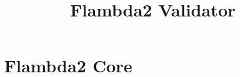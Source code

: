 \documentclass[11pt,fleqn]{amsart}
\begin{document}
\title{Flambda2 Validator}
\date{}
\maketitle{}


\section{Flambda2 Core}

\newcommand{\expr}{\mathit{exp}}
\newcommand{\var}{\mathit{var}}
\newcommand{\named}{\mathit{named}}
\newcommand{\arms}{\mathit{arms}}
\newcommand{\codeid}{\mathit{id}}
\newcommand{\code}{\mathit{code}}
\newcommand{\setofclo}{P}
\newcommand{\block}{\mathit{block}}
\newcommand{\blockpat}{\mathit{b}}
\newcommand{\simple}{\mathit{simple}}
\newcommand{\prim}{\mathit{prim}}
\newcommand{\staticconsts}{\chi}
\newcommand{\recinfo}{\mathsf{rec\_info}}
\newcommand{\idexpr}{\mathit{id\_exp}}
\newcommand{\simpleexpr}{\mathit{simple\_exp}}
\newcommand{\symb}{\mathit{symbol}}
\newcommand{\const}{\mathit{const}}
\newcommand{\callid}{\kappa}
\newcommand{\direct}{\mathsf{direct}}
\newcommand{\indirect}{\mathsf{indirect}}
\newcommand{\method}{\mathsf{method}}
\newcommand{\ccall}{\mathsf{c\_call}}
\newcommand{\blockconst}[3]{\mathsf{block}(#1,\,#2,\,#3)}
\newcommand{\contid}[1]{\mathsf{cont}\; #1}

\newcommand{\sep}{\; | \;}
\newcommand{\letexp}[3]{\mathsf{let}\; #1 \; = \; #2 \; \mathsf{in} \; #3}
\newcommand{\letcodeexp}[3]{\mathsf{let}\; (\mathsf{code}^{\uparrow} \; #1) \; = \; #2 \; \mathsf{in} \; #3}
\newcommand{\letcloexp}[3]{\mathsf{let}\; (\mathsf{clo} \; #1) \; = \; #2 \; \mathsf{in} \; #3}
\newcommand{\letstaticcloexp}[3]{\mathsf{let}\; (\mathsf{clo}^{\uparrow} \; #1) \; = \; #2 \; \mathsf{in} \; #3}
\newcommand{\letblockexp}[3]{\mathsf{let}\; (\mathsf{block}^{\uparrow} \; #1) \; = \; #2 \; \mathsf{in} \; #3}
\newcommand{\subst}[3]{#1 \; [ #2 \setminus #3 ]}
\newcommand{\letcont}[4]{#1 \; \mathsf{where} \; (\contid{#2}) \; #3 \; = \; #4}
\newcommand{\step}{\longrightarrow}
\newcommand{\applycont}[2]{#1 \; #2}
\newcommand{\apply}[5]{\mathsf{call}(#1) \; \mathsf{with} \; (#2, \, #3, \, #4, \, #5)}
\newcommand{\abst}[2]{\lambda \; #1.\, #2}
\newcommand{\switch}[2]{\mathsf{switch}\; (#1) \; #2}
\newcommand{\args}[1]{\overrightarrow{#1}}
\newcommand{\substchain}[2]{\; [ #1 \setminus #2 ]}
\newcommand{\invalid}{\mathsf{invalid}}
\newcommand{\load}[3]{\mathsf{load}(#1,\,#2,\,#3)}
\newcommand{\makeblock}[3]{\mathsf{make\_block}(#1,\,#2,\,#3)}
\end{document}
